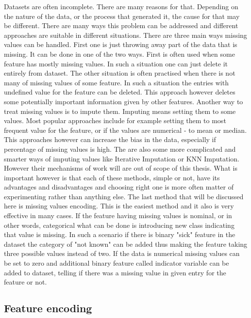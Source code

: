 \documentclass[a4paper,twoside,12pt]{book}
\begin{document}
Datasets are often incomplete. There are many reasons for that. Depending on the nature of the data, or the process that generated it, the cause for that may be different. There are many ways this problem can be addressed and different approaches are suitable in different situations.
There are three main ways missing values can be handled. First one is just throwing away part of the data that is missing. It can be done in one of the two ways. First is often used when some feature has mostly missing values. In such a situation one can just delete it entirely from dataset. The other situation is often practised when there is not many of missing values of some feature. In such a situation the entries with undefined value for the feature can be deleted. This approach however deletes some potentially important information given by other features.
Another way to treat missing values is to impute them. Imputing means setting them to some values. Most popular approaches include for example setting them to most frequent value for the feature, or if the values are numerical - to mean or median. This approaches however can increase the bias in the data, especially if percentage of missing values is high. 
The are also some more complicated and smarter ways of imputing values like Iterative Imputation\cite{liu2013comparison} or KNN Imputation\cite{beretta2016nearest}. However their mechanisms of work will are out of scope of this thesis.
What is important however is that each of these methods, simple or not, have its advantages and disadvantages and choosing right one is more often matter of experimenting rather than anything else.
The last method that will be discussed here is missing values encoding. This is the easiest method and it also is very effective in many cases. If the feature having missing values is nominal, or in other words, categorical what can be done is introducing new class indicating that value is missing. In such a scenario if there is binary "sick" feature in the dataset the category of "not known" can be added thus making the feature taking three possible values instead of two. If the data is numerical missing values can be set to zero and additional binary feature called indicator variable can be added to dataset, telling if there was a missing value in given entry for the feature or not.

\subsection{Feature encoding}
\end{document}
